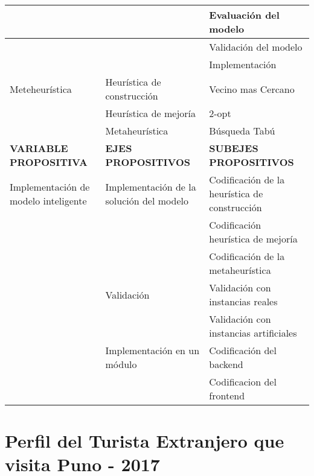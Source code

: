 \begin{landscape}
\begin{table}[ht]
\begin{tabular}{|l|l|l|}
                                     &                                         & Evaluación del modelo                          \\ \hline
                                     &                                         & Validación del modelo                          \\ \hline
                                     &                                         & Implementación                                 \\ \hline
Meteheurística                       & Heurística de construcción              & Vecino mas Cercano                             \\ \hline
                                     & Heurística de mejoría                   & 2-opt                                          \\ \hline
                                     & Metaheurística                          & Búsqueda Tabú                                  \\ \hline
\textbf{VARIABLE PROPOSITIVA}        & \textbf{EJES PROPOSITIVOS}              & \textbf{SUBEJES PROPOSITIVOS}                  \\ \hline
Implementación de modelo inteligente & Implementación de la solución del modelo & Codificación de la heurística de construcción \\ \hline
                                     &                                         & Codificación heurística de mejoría             \\ \hline
                                     &                                         & Codificación de la metaheurística              \\ \hline
                                     & Validación                              & Validación con instancias reales               \\ \hline
                                     &                                         & Validación con instancias artificiales         \\ \hline
                                     & Implementación en un módulo             & Codificación del backend                       \\ \hline
                                     &                                         & Codificacion del frontend                      \\ \hline
\end{tabular}
\end{table}
\end{landscape}

\section{Perfil del Turista Extranjero que visita Puno - 2017}

%
